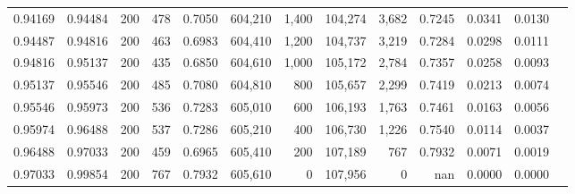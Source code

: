 \begin{tabular}{rrrrrrrrrrrrr}
0.94169 & 0.94484 &    200 & 478 &                                     0.7050 & 604,210 &   1,400 & 104,274 &   3,682 & 0.7245 & 0.0341 & 0.0130 \\
0.94487 & 0.94816 &    200 & 463 &                                     0.6983 & 604,410 &   1,200 & 104,737 &   3,219 & 0.7284 & 0.0298 & 0.0111 \\
0.94816 & 0.95137 &    200 & 435 &                                     0.6850 & 604,610 &   1,000 & 105,172 &   2,784 & 0.7357 & 0.0258 & 0.0093 \\
0.95137 & 0.95546 &    200 & 485 &                                     0.7080 & 604,810 &     800 & 105,657 &   2,299 & 0.7419 & 0.0213 & 0.0074 \\
0.95546 & 0.95973 &    200 & 536 &                                     0.7283 & 605,010 &     600 & 106,193 &   1,763 & 0.7461 & 0.0163 & 0.0056 \\
0.95974 & 0.96488 &    200 & 537 &                                     0.7286 & 605,210 &     400 & 106,730 &   1,226 & 0.7540 & 0.0114 & 0.0037 \\
0.96488 & 0.97033 &    200 & 459 &                                     0.6965 & 605,410 &     200 & 107,189 &     767 & 0.7932 & 0.0071 & 0.0019 \\
0.97033 & 0.99854 &    200 & 767 &                                     0.7932 & 605,610 &       0 & 107,956 &       0 &    nan & 0.0000 & 0.0000 \\
\bottomrule
\end{tabular}

